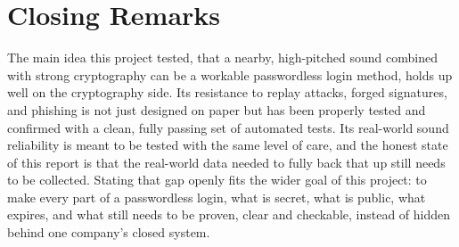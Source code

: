 \section{Closing Remarks}

The main idea this project tested, that a nearby, high-pitched sound
combined with strong cryptography can be a workable passwordless login
method, holds up well on the cryptography side. Its resistance to replay
attacks, forged signatures, and phishing is not just designed on paper but
has been properly tested and confirmed with a clean, fully passing set of
automated tests. Its real-world sound reliability is meant to be tested
with the same level of care, and the honest state of this report is that
the real-world data needed to fully back that up still needs to be
collected. Stating that gap openly fits the wider goal of this project:
to make every part of a passwordless login, what is secret, what is
public, what expires, and what still needs to be proven, clear and
checkable, instead of hidden behind one company's closed system.
